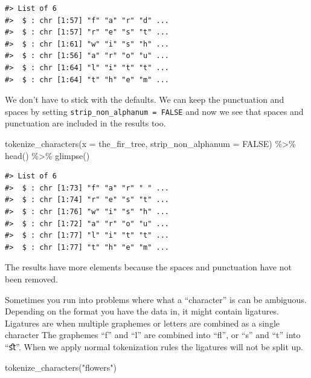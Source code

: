 \documentclass[
]{krantz}
\makeatletter
\newenvironment{Shaded}{\begin{snugshade}}{\end{snugshade}}
\newcommand{\AttributeTok}[1]{\textcolor[rgb]{0.77,0.63,0.00}{#1}}
\newcommand{\ConstantTok}[1]{\textcolor[rgb]{0.00,0.00,0.00}{#1}}
\newcommand{\FunctionTok}[1]{\textcolor[rgb]{0.00,0.00,0.00}{#1}}
\newcommand{\NormalTok}[1]{#1}
\newcommand{\SpecialCharTok}[1]{\textcolor[rgb]{0.00,0.00,0.00}{#1}}
\newcommand{\StringTok}[1]{\textcolor[rgb]{0.31,0.60,0.02}{#1}}
\newenvironment{kframe}{%
\medskip{}
\setlength{\fboxsep}{.8em}
 \def\at@end@of@kframe{}%
 \ifinner\ifhmode%
  \def\at@end@of@kframe{\end{minipage}}%
  \begin{minipage}{\columnwidth}%
 \fi\fi%
 \def\FrameCommand##1{\hskip\@totalleftmargin \hskip-\fboxsep
 \colorbox{shadecolor}{##1}\hskip-\fboxsep
     \hskip-\linewidth \hskip-\@totalleftmargin \hskip\columnwidth}%
 \MakeFramed {\advance\hsize-\width
   \@totalleftmargin\z@ \linewidth\hsize
   \@setminipage}}%
 {\par\unskip\endMakeFramed%
 \at@end@of@kframe}
\renewenvironment{Shaded}{\begin{kframe}}{\end{kframe}}
\makeatother
\begin{document}
\begin{verbatim}
#> List of 6
#>  $ : chr [1:57] "f" "a" "r" "d" ...
#>  $ : chr [1:57] "r" "e" "s" "t" ...
#>  $ : chr [1:61] "w" "i" "s" "h" ...
#>  $ : chr [1:56] "a" "r" "o" "u" ...
#>  $ : chr [1:64] "l" "i" "t" "t" ...
#>  $ : chr [1:64] "t" "h" "e" "m" ...
\end{verbatim}

We don't have to stick with the defaults. We can keep the punctuation and spaces by setting \texttt{strip\_non\_alphanum\ =\ FALSE} and now we see that spaces and punctuation are included in the results too.

\begin{Shaded}
\begin{Highlighting}[]
\FunctionTok{tokenize\_characters}\NormalTok{(}\AttributeTok{x =}\NormalTok{ the\_fir\_tree,}
                    \AttributeTok{strip\_non\_alphanum =} \ConstantTok{FALSE}\NormalTok{) }\SpecialCharTok{\%\textgreater{}\%}
  \FunctionTok{head}\NormalTok{() }\SpecialCharTok{\%\textgreater{}\%}
  \FunctionTok{glimpse}\NormalTok{()}
\end{Highlighting}
\end{Shaded}

\begin{verbatim}
#> List of 6
#>  $ : chr [1:73] "f" "a" "r" " " ...
#>  $ : chr [1:74] "r" "e" "s" "t" ...
#>  $ : chr [1:76] "w" "i" "s" "h" ...
#>  $ : chr [1:72] "a" "r" "o" "u" ...
#>  $ : chr [1:77] "l" "i" "t" "t" ...
#>  $ : chr [1:77] "t" "h" "e" "m" ...
\end{verbatim}

The results have more elements because the spaces and punctuation have not been removed.

Sometimes you run into problems where what a ``character'' is can be ambiguous. Depending on the format you have the data in, it might contain ligatures. Ligatures are when multiple graphemes or letters are combined as a single character The graphemes ``f'' and ``l'' are combined into ``ﬂ'', or ``s'' and ``t'' into ``ﬆ''. When we apply normal tokenization rules the ligatures will not be split up.

\begin{Shaded}
\begin{Highlighting}[]
\FunctionTok{tokenize\_characters}\NormalTok{(}\StringTok{"ﬂowers"}\NormalTok{)}
\end{Highlighting}
\end{Shaded}
\end{document}
